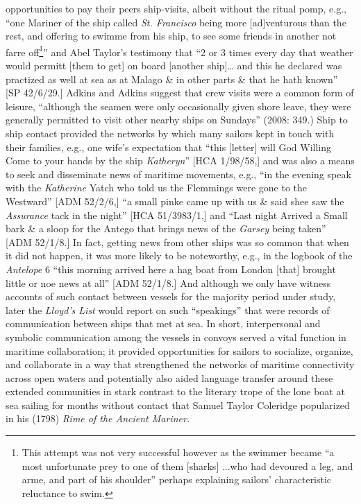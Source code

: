 opportunities to pay their peers ship-visits, albeit without the ritual pomp, e.g., “one Mariner of the ship called \textit{St. Francisco} being more [ad]venturous than the rest, and offering to swimme from his ship, to see some friends in another not farre off\footnote{This attempt was not very successful however as the swimmer became “a most unfortunate prey to one of them [sharks] ...who had devoured a leg, and arme, and part of his shoulder” \citep[21]{Gage1648} perhaps explaining sailors’ characteristic reluctance to swim.}” \citep[21,]{Gage1648} and Abel Taylor’s testimony that “2 or 3 times every day that weather would permitt [them to get] on board [another ship]… and this he declared was practized as well at sea as at Malago \& in other parts \& that he hath known” [SP 42/6/29.] Adkins and Adkins suggest that crew visits were a common form of leisure, “although the seamen were only occasionally given shore leave, they were generally permitted to visit other nearby ships on Sundays” (2008: 349.) Ship to ship contact provided the networks by which many sailors kept in touch with their families, e.g., one wife’s expectation that “this [letter] will God Willing Come to your hands by the ship \textit{Katheryn}” [HCA 1/98/58,] and was also a means to seek and disseminate news of maritime movements, e.g., “in the evening speak with the \textit{Katherine} Yatch who told us the Flemmings were gone to the Westward” [ADM 52/2/6,] “a small pinke came up with us \& said shee saw the \textit{Assurance} tack in the night” [HCA 51/3983/1,] and “Last night Arrived a Small bark \& a sloop for the Antego that brings news of the \textit{Garsey} being taken” [ADM 52/1/8.] In fact, getting news from other ships was so common that when it did not happen, it was more likely to be noteworthy, e.g., in the logbook of the \textit{Antelope} 6 \citealt{March1691} “this morning arrived here a hag boat from London [that] brought little or noe news at all” [ADM 52/1/8.] And although we only have witness accounts of such contact between vessels for the majority period under study, later the \textit{Lloyd's List} would report on such “speakings” that were records of communication between ships that met at sea. In short, interpersonal and symbolic communication among the vessels in convoys served a vital function in maritime collaboration; it provided opportunities for sailors to socialize, organize, and collaborate in a way that strengthened the networks of maritime connectivity across open waters and potentially also aided language transfer around these extended communities in stark contrast to the literary trope of the lone boat at sea sailing for months without contact that Samuel Taylor Coleridge popularized in his (1798) \textit{Rime of the \MakeUppercase{A}}\textit{ncient Mariner.} 

